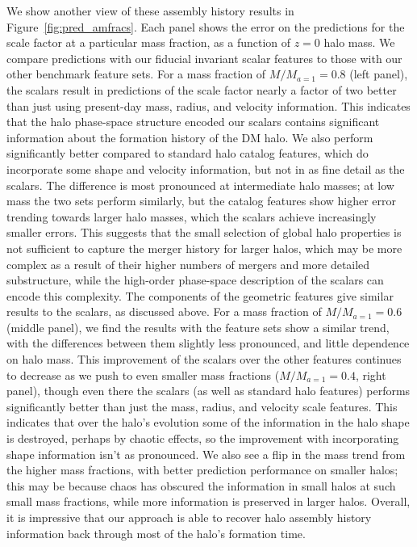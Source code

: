 We show another view of these assembly history results in Figure~\ref{fig:pred_amfracs}.
Each panel shows the error on the predictions for the scale factor at a particular mass fraction, as a function of $z=0$ halo mass. 
We compare predictions with our fiducial invariant scalar features to those with our other benchmark feature sets.
For a mass fraction of $M/M_{a=1} = 0.8$ (left panel), the scalars result in predictions of the scale factor nearly a factor of two better than just using present-day mass, radius, and velocity information.
This indicates that the halo phase-space structure encoded our scalars contains significant information about the formation history of the DM halo.
We also perform significantly better compared to standard halo catalog features, which do incorporate some shape and velocity information, but not in as fine detail as the scalars.
The difference is most pronounced at intermediate halo masses; at low mass the two sets perform similarly, but the catalog features show higher error trending towards larger halo masses, which the scalars achieve increasingly smaller errors.
This suggests that the small selection of global halo properties is not sufficient to capture the merger history for larger halos, which may be more complex as a result of their higher numbers of mergers and more detailed substructure, while the high-order phase-space description of the scalars can encode this complexity.
The components of the geometric features give similar results to the scalars, as discussed above.
For a mass fraction of $M/M_{a=1} = 0.6$ (middle panel), we find the results with the feature sets show a similar trend, with the differences between them slightly less pronounced, and little dependence on halo mass.
This improvement of the scalars over the other features continues to decrease as we push to even smaller mass fractions ($M/M_{a=1} = 0.4$, right panel), though even there the scalars (as well as standard halo features) performs significantly better than just the mass, radius, and velocity scale features.
This indicates that over the halo's evolution some of the information in the halo shape is destroyed, perhaps by chaotic effects, so the improvement with incorporating shape information isn't as pronounced. 
We also see a flip in the mass trend from the higher mass fractions, with better prediction performance on smaller halos; this may be because chaos has obscured the information in small halos at such small mass fractions, while more information is preserved in larger halos.
Overall, it is impressive that our approach is able to recover halo assembly history information back through most of the halo's formation time.

